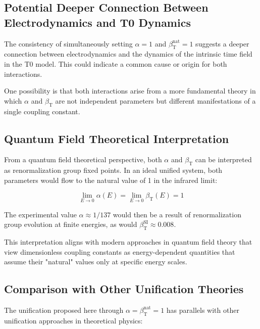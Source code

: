 ﻿\documentclass[12pt,a4paper]{article}
\newcommand{\betaT}{\beta_{\text{T}}}
\begin{document}
	\subsection{Potential Deeper Connection Between Electrodynamics and T0 Dynamics}
	
	The consistency of simultaneously setting \(\alpha = 1\) and \(\betaT^{\text{nat}} = 1\) suggests a deeper connection between electrodynamics and the dynamics of the intrinsic time field in the T0 model. This could indicate a common cause or origin for both interactions.
	
	One possibility is that both interactions arise from a more fundamental theory in which \(\alpha\) and \(\betaT\) are not independent parameters but different manifestations of a single coupling constant.
	
	\subsection{Quantum Field Theoretical Interpretation}
	
	From a quantum field theoretical perspective, both \(\alpha\) and \(\betaT\) can be interpreted as renormalization group fixed points. In an ideal unified system, both parameters would flow to the natural value of 1 in the infrared limit:
	
	\begin{equation}
		\lim_{E \to 0} \alpha(E) = \lim_{E \to 0} \betaT(E) = 1
	\end{equation}
	
	The experimental value \(\alpha \approx 1/137\) would then be a result of renormalization group evolution at finite energies, as would \(\betaT^{\text{SI}} \approx 0.008\).
	
	This interpretation aligns with modern approaches in quantum field theory that view dimensionless coupling constants as energy-dependent quantities that assume their "natural" values only at specific energy scales.
	
	\subsection{Comparison with Other Unification Theories}
	
	The unification proposed here through \(\alpha = \betaT^{\text{nat}} = 1\) has parallels with other unification approaches in theoretical physics:
	
\end{document}
